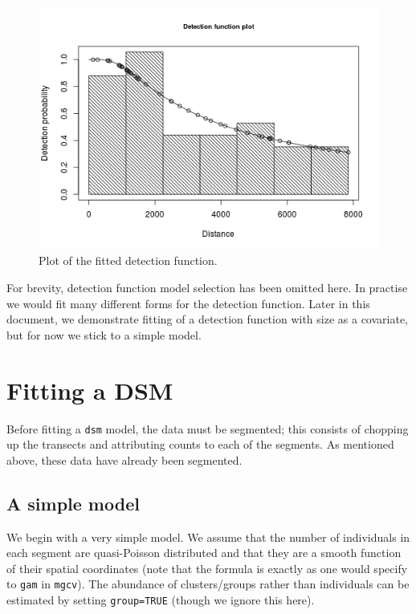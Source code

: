 \documentclass[]{amsart}
\makeatletter
\def\maxwidth{\ifdim\Gin@nat@width>\linewidth\linewidth
\else\Gin@nat@width\fi}
\let\Oldincludegraphics\includegraphics
\renewcommand{\includegraphics}[1]{\Oldincludegraphics[width=\maxwidth]{#1}}
\makeatother
\begin{document}
\begin{figure}[htbp]
\centering
\includegraphics{mexico-figs/hr-detfct.png}
\caption{Plot of the fitted detection function.}
\end{figure}

For brevity, detection function model selection has been omitted here.
In practise we would fit many different forms for the detection
function. Later in this document, we demonstrate fitting of a detection
function with size as a covariate, but for now we stick to a simple
model.

\section{Fitting a DSM}

Before fitting a \texttt{dsm} model, the data must be segmented; this
consists of chopping up the transects and attributing counts to each of
the segments. As mentioned above, these data have already been
segmented.

\subsection{A simple model}

We begin with a very simple model. We assume that the number of
individuals in each segment are quasi-Poisson distributed and that they
are a smooth function of their spatial coordinates (note that the
formula is exactly as one would specify to \texttt{gam} in
\texttt{mgcv}). The abundance of clusters/groups rather than individuals
can be estimated by setting \texttt{group=TRUE} (though we ignore this
here).
\end{document}
